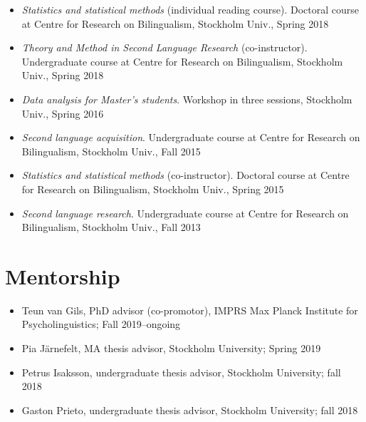 \documentclass[margin, 11pt]{res} %
\begin{document}
\begin{resume}
\begin{itemize}
\item \textit{Statistics and statistical methods} (individual reading course). Doctoral course at Centre for Research on Bilingualism, Stockholm Univ., Spring 2018

\item \textit{Theory and Method in Second Language Research} (co-instructor). Undergraduate course at Centre for Research on Bilingualism, Stockholm Univ., Spring 2018

\item \textit{Data analysis for Master's students}. Workshop in three sessions, Stockholm Univ., Spring 2016

\item \textit{Second language acquisition}. Undergraduate course at Centre for Research on Bilingualism, Stockholm Univ., Fall 2015

\item \textit{Statistics and statistical methods} (co-instructor). Doctoral course at Centre for Research on Bilingualism, Stockholm Univ., Spring 2015

\item \textit{Second language research}. Undergraduate course at Centre for Research on Bilingualism, Stockholm Univ., Fall 2013 

\end{itemize}


\section{\sc Mentorship}

\begin{itemize}

\item Teun van Gils, PhD advisor (co-promotor), IMPRS Max Planck Institute for Psycholinguistics; Fall 2019--ongoing

\item Pia Järnefelt, MA thesis advisor, Stockholm University; Spring 2019

\item Petrus Isaksson, undergraduate thesis advisor, Stockholm University; fall 2018

\item Gaston Prieto, undergraduate thesis advisor, Stockholm University; fall 2018

\end{itemize}




\end{resume}
\end{document}
